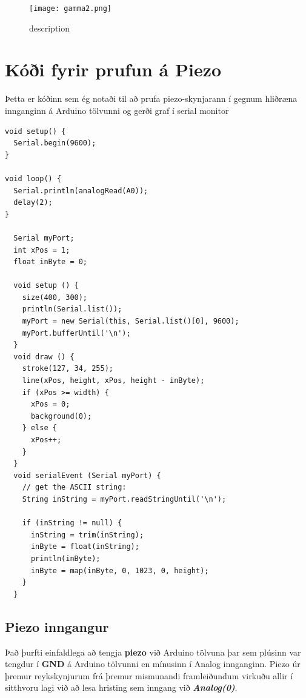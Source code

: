 \documentclass{article}
\begin{document}
 \begin{figure}[H]
  	\centering
  	\texttt{[image: gamma2.png]}
  	\caption{description}
 	 \label{figure1}
\end{figure}

\newpage
\section{Kóði fyrir prufun á Piezo}

\begin{flushleft}Þetta er kóðinn sem ég notaði til að prufa piezo-skynjarann í gegnum hliðræna innganginn á Arduino tölvunni og gerði graf í serial monitor
\end{flushleft}

\begin{lstlisting}[language=Arduino,caption=Kóði fyrir serial plotter, frame=none,label=code-serial]
void setup() {
  Serial.begin(9600);
}

void loop() {
  Serial.println(analogRead(A0));
  delay(2);
}

  Serial myPort;     
  int xPos = 1;         
  float inByte = 0;

  void setup () {
    size(400, 300);
    println(Serial.list());
    myPort = new Serial(this, Serial.list()[0], 9600);
    myPort.bufferUntil('\n');
  }
  void draw () {
    stroke(127, 34, 255);
    line(xPos, height, xPos, height - inByte);
    if (xPos >= width) {
      xPos = 0;
      background(0);
    } else {
      xPos++;
    }
  }
  void serialEvent (Serial myPort) {
    // get the ASCII string:
    String inString = myPort.readStringUntil('\n');

    if (inString != null) {
      inString = trim(inString);
      inByte = float(inString);
      println(inByte);
      inByte = map(inByte, 0, 1023, 0, height);
    }
  }
\end{lstlisting}
\newpage

\subsection{Piezo inngangur}
\begin{flushleft}
Það þurfti einfaldlega að tengja \textbf{piezo} við Arduino tölvuna þar sem plúsinn var tengdur í \textbf{GND} á Arduino tölvunni en mínusinn í Analog innganginn.  Piezo úr þremur reykskynjurum frá þremur mismunandi framleiðundum virkuðu allir í sitthvoru lagi við að lesa hristing sem inngang við \textbf{\textit{Analog(0)}}. 
\end{flushleft}
\end{document}
